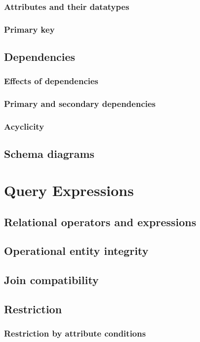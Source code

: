 \documentclass[letter,10pt]{article}
\begin{document}
\subsubsection{Attributes and their datatypes}
\subsubsection{Primary key}

\subsection{Dependencies}
\subsubsection{Effects of dependencies}
\subsubsection{Primary and secondary dependencies}
\subsubsection{Acyclicity}

\subsection{Schema diagrams}

\section{Query Expressions}
\subsection{Relational operators and expressions}
\subsection{Operational entity integrity}
\subsection{Join compatibility}
\subsection{Restriction}
\subsubsection{Restriction by attribute conditions}
\end{document}
